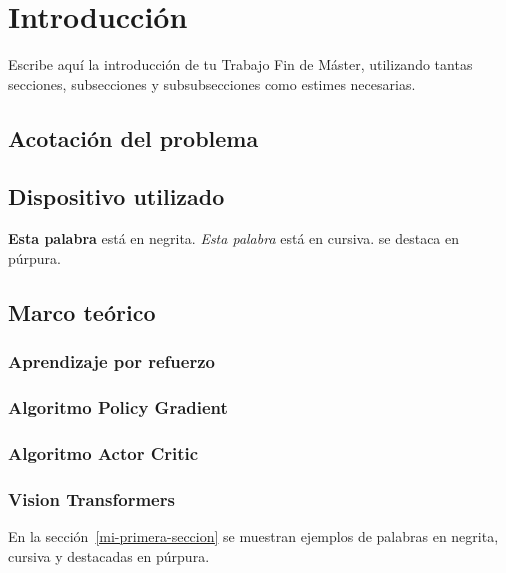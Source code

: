 
\cleardoublepage

\chapter{Introducción}
\label{introduccion}

Escribe aquí la introducción de tu Trabajo Fin de Máster, utilizando tantas secciones, subsecciones y subsubsecciones como estimes necesarias.

\section{Acotación del problema}
\label{acotacion-del-problema}

\section{Dispositivo utilizado}
\label{dispositivo-utilizado}

\textbf{Esta palabra} está en negrita. \textit{Esta palabra} está en cursiva.  se destaca en púrpura.
\medskip

\section{Marco teórico}
\subsection{Aprendizaje por refuerzo}
\label{aprendizaje-por-refuerzo}

\subsection{Algoritmo Policy Gradient}
\label{algoritmo-policy-gradient}

\subsection{Algoritmo Actor Critic}
\label{algoritmo-actor-critic}

\subsection{Vision Transformers}
\label{vision-transformers}


En la sección~\ref{mi-primera-seccion} se muestran ejemplos de palabras en negrita, cursiva y destacadas en púrpura.
\medskip

